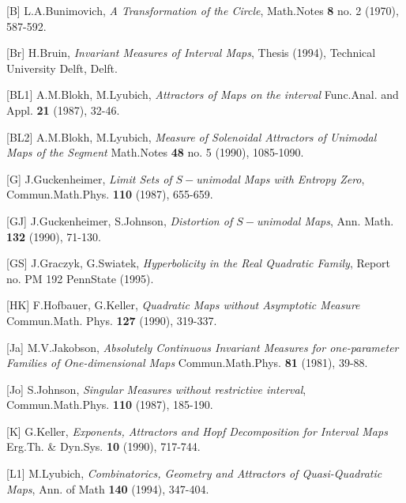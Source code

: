 \item{[B]} L.A.Bunimovich, {\it A Transformation of the Circle},
           Math.Notes {\bf 8} no. 2 (1970), 587-592.

\item{[Br]} H.Bruin, {\it Invariant Measures of Interval Maps},
            Thesis (1994), Technical University Delft, Delft.

\item{[BL1]} A.M.Blokh, M.Lyubich, {\it Attractors of Maps on the interval}
            Func.Anal. and Appl. {\bf 21} (1987), 32-46.

\item{[BL2]} A.M.Blokh, M.Lyubich, {\it Measure of Solenoidal Attractors
            of Unimodal Maps of the Segment} Math.Notes {\bf 48} no. 5 (1990),
            1085-1090.

\item{[G]} J.Guckenheimer, {\it Limit Sets of $S-$unimodal Maps with
            Entropy Zero}, Commun.Math.Phys. {\bf 110} (1987), 655-659.

\item{[GJ]} J.Guckenheimer, S.Johnson, {\it Distortion of $S-$unimodal Maps},
            Ann. Math. {\bf 132} (1990), 71-130. 

\item{[GS]} J.Graczyk, G.Swiatek, {\it Hyperbolicity in the Real
            Quadratic Family}, Report no. PM 192 PennState (1995).

\item{[HK]} F.Hofbauer, G.Keller, {\it Quadratic Maps without Asymptotic
            Measure} Commun.Math. Phys. {\bf 127} (1990), 319-337.

\item{[Ja]} M.V.Jakobson, {\it Absolutely Continuous Invariant Measures 
           for one-parameter Families of One-dimensional Maps} 
           Commun.Math.Phys. {\bf 81} (1981), 39-88.

\item{[Jo]} S.Johnson, {\it Singular Measures without restrictive interval},
           Commun.Math.Phys. {\bf 110} (1987), 185-190.

\item{[K]} G.Keller, {\it Exponents, Attractors and Hopf Decomposition
            for Interval Maps} Erg.Th. \& Dyn.Sys. {\bf 10} (1990), 717-744. 

\item{[L1]} M.Lyubich, {\it Combinatorics, Geometry and Attractors of
            Quasi-Quadratic Maps}, Ann. of Math {\bf 140} (1994), 347-404.

